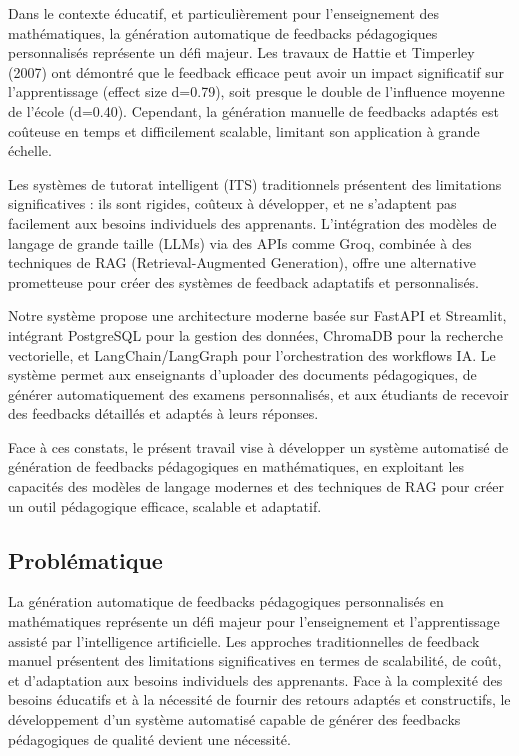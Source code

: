 Dans le contexte éducatif, et particulièrement pour l'enseignement des mathématiques, la génération automatique de feedbacks pédagogiques personnalisés représente un défi majeur. Les travaux de Hattie et Timperley (2007) ont démontré que le feedback efficace peut avoir un impact significatif sur l'apprentissage (effect size d=0.79), soit presque le double de l'influence moyenne de l'école (d=0.40). Cependant, la génération manuelle de feedbacks adaptés est coûteuse en temps et difficilement scalable, limitant son application à grande échelle.

Les systèmes de tutorat intelligent (ITS) traditionnels présentent des limitations significatives : ils sont rigides, coûteux à développer, et ne s'adaptent pas facilement aux besoins individuels des apprenants. L'intégration des modèles de langage de grande taille (LLMs) via des APIs comme Groq, combinée à des techniques de RAG (Retrieval-Augmented Generation), offre une alternative prometteuse pour créer des systèmes de feedback adaptatifs et personnalisés.

Notre système propose une architecture moderne basée sur FastAPI et Streamlit, intégrant PostgreSQL pour la gestion des données, ChromaDB pour la recherche vectorielle, et LangChain/LangGraph pour l'orchestration des workflows IA. Le système permet aux enseignants d'uploader des documents pédagogiques, de générer automatiquement des examens personnalisés, et aux étudiants de recevoir des feedbacks détaillés et adaptés à leurs réponses.

Face à ces constats, le présent travail vise à développer un système automatisé de génération de feedbacks pédagogiques en mathématiques, en exploitant les capacités des modèles de langage modernes et des techniques de RAG pour créer un outil pédagogique efficace, scalable et adaptatif.

\subsection{Problématique}

La génération automatique de feedbacks pédagogiques personnalisés en mathématiques représente un défi majeur pour l'enseignement et l'apprentissage assisté par l'intelligence artificielle. Les approches traditionnelles de feedback manuel présentent des limitations significatives en termes de scalabilité, de coût, et d'adaptation aux besoins individuels des apprenants. Face à la complexité des besoins éducatifs et à la nécessité de fournir des retours adaptés et constructifs, le développement d'un système automatisé capable de générer des feedbacks pédagogiques de qualité devient une nécessité.

